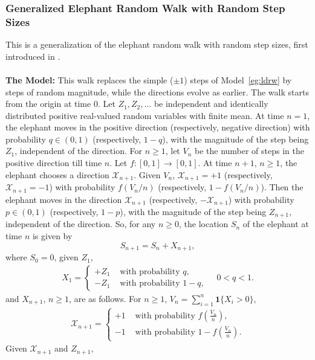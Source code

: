 \documentclass[12pt]{amsart}
\theoremstyle{plain}
\theoremstyle{remark}
\numberwithin{equation}{section}
\begin{document}
\subsubsection{Generalized Elephant Random Walk with Random Step Sizes}\label{eg:gerwrs}
This is a generalization of the elephant random walk with random step sizes, first introduced in \cite{erwrs1}. \hfill \\\\
\textbf{The Model:} This walk replaces the simple ($\pm 1$) steps of Model~\ref{eg:ldrw} by steps of random magnitude, while the directions evolve as earlier. The walk starts from the origin at time $0$. Let $Z_1, Z_2, \ldots$ be independent and identically distributed positive real-valued random variables with finite mean. At time $n = 1$, the elephant moves in the positive direction (respectively, negative direction) with probability $q \in (0,1)$ (respectively, $1 - q$), with the magnitude of the step being $Z_1$, independent of the direction. For $n \geq 1$, let $V_n$ be the number of steps in the positive direction till time $n$. Let $f : [0,1] \to [0,1]$. At time $n + 1$, $n \geq 1$, the elephant chooses a direction $\mathcal{X}_{n+1}$. 
Given $V_n$, $\mathcal{X}_{n+1} = +1$ (respectively, $\mathcal{X}_{n+1} = -1$) with probability $f(V_n/n)$ (respectively, $1 - f(V_n/n)$). Then the elephant moves in the direction $\mathcal{X}_{n+1}$ (respectively, $-\mathcal{X}_{n+1}$) with probability $p \in (0,1)$ (respectively, $1-p$), with the magnitude of the step being $Z_{n+1}$, independent of the direction. So, for any $n\geq 0$, the location $S_n$ of the elephant at time $n$ is given by
\[
    S_{n+1} = S_{n} + X_{n+1},
\]
where $S_0 = 0$, given $Z_1$,
\begin{align*}
   X_{1} = \begin{cases} +Z_1 &\text{ with probability } q, \\ -Z_1
   &\text{ with probability } 1 - q, \end{cases} \quad 0 < q < 1.
\end{align*} 
and $X_{n+1}$, $n \geq 1$, are as follows. For $n \geq 1$, $V_{n} = \sum_{i=1}^n \boldsymbol{1}\{X_i > 0\}$,
\begin{align*}
    \mathcal{X}_{n+1} = \begin{cases}+1 &\text{ with probability } f\left(\frac{V_n}{n}\right), \\ -1
   &\text{ with probability } 1-f\left(\frac{V_n}{n}\right).\end{cases}
\end{align*}
Given $\mathcal{X}_{n+1}$ and $Z_{n+1}$, 
\end{document}
